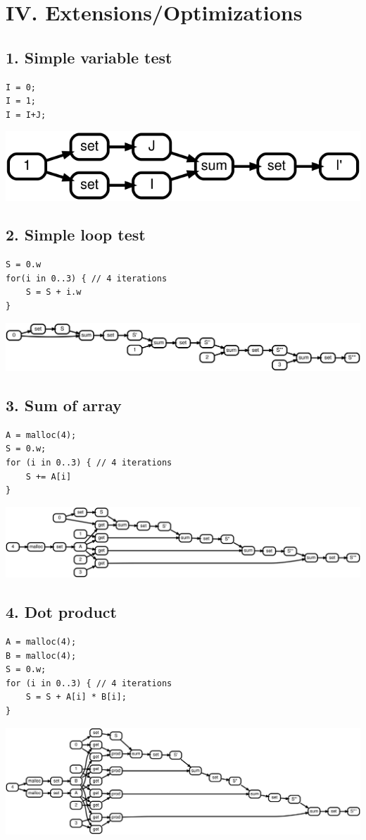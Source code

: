 \documentclass[11pt]{article}
\begin{document}
\pagebreak\section*{IV. Extensions/Optimizations}

\subsection*{1. Simple variable test}

\begin{lstlisting}
I = 0;
I = 1;
I = I+J;
\end{lstlisting}

\includegraphics[scale=0.25]{rtd41}

\pagebreak\subsection*{2. Simple loop test}

\begin{lstlisting}
S = 0.w
for(i in 0..3) { // 4 iterations
    S = S + i.w
}
\end{lstlisting}

\includegraphics[scale=0.25]{rtd42}

\pagebreak\subsection*{3. Sum of array}

\begin{lstlisting}
A = malloc(4);
S = 0.w;
for (i in 0..3) { // 4 iterations
    S += A[i]
}
\end{lstlisting}

\includegraphics[scale=0.25]{rtd43}

\pagebreak\subsection*{4. Dot product}

\begin{lstlisting}
A = malloc(4);
B = malloc(4);
S = 0.w;
for (i in 0..3) { // 4 iterations
    S = S + A[i] * B[i];
}
\end{lstlisting}

\includegraphics[scale=0.25]{rtd44}
\end{document}
